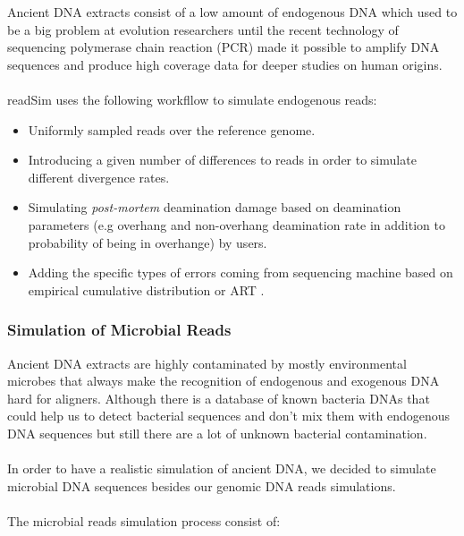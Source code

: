 \documentclass[11pt,a4paper]{report}
\begin{document}
Ancient DNA extracts consist of a low amount of endogenous DNA which used to be 
a big problem at evolution researchers until the recent technology of sequencing 
polymerase chain reaction (PCR) \cite{PCR} made it possible to amplify DNA 
sequences and produce high coverage data for deeper studies on human origins.
\\\\
readSim uses the following workfllow to simulate endogenous reads:
\begin{itemize}
 \item Uniformly sampled reads over the reference genome.

 \item Introducing a given number of differences to 
 reads in order to simulate different divergence rates.

 \item Simulating \emph{post-mortem} deamination damage based on deamination 
parameters (e.g overhang and non-overhang deamination rate in addition to 
probability of being in overhange) by users. 

 \item Adding the specific types of errors coming from sequencing machine based
on empirical cumulative distribution or ART .
\end{itemize}





\subsubsection{Simulation of Microbial Reads } \label{Simulation of Microbial Reads }

Ancient DNA extracts are highly contaminated by mostly environmental microbes 
that always make the recognition of endogenous and exogenous DNA hard for aligners.
Although there is a database of known bacteria DNAs that could help us to detect 
bacterial sequences and don't mix them with endogenous DNA sequences but still 
there are a lot of unknown bacterial contamination.
\\\\
In order to have a realistic simulation of ancient DNA, we decided to simulate 
microbial DNA sequences besides our genomic DNA reads simulations.
\\\\
The microbial reads simulation process consist of:
\end{document}
